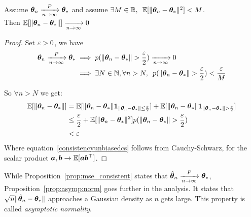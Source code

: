 \begin{proposition}
  \label{prop:consistency_unbiasedness}
  Assume $\boldsymbol{\theta}_n\xrightarrow[n \rightarrow \infty]{P} \boldsymbol{\theta}_*$ and assume
  $\exists M \in \mathbb{R}, \enspace \mathbb{E}[\|\boldsymbol{\theta}_n - \boldsymbol{\theta}_*\|^2] < M$. \\
  Then $\mathbb{E}[\|\boldsymbol{\theta}_n - \boldsymbol{\theta}_*\|] \xrightarrow[n \rightarrow \infty]{} 0$
\end{proposition}
\begin{proof}
  Set $\varepsilon > 0$, we have
  \begin{align}
    \boldsymbol{\theta}_n\xrightarrow[n \rightarrow \infty]{P} \boldsymbol{\theta}_* &\implies p(\|\boldsymbol{\theta}_n - \boldsymbol{\theta}_*\| > \frac{\varepsilon}{2}) \xrightarrow[n \rightarrow
                                                             \infty]{}0\\
                                                           &\implies \exists N \in \mathbb{N}, \forall n > N, \enspace
                                                             p(\|\boldsymbol{\theta}_n - \boldsymbol{\theta}_*\| > \frac{\varepsilon}{2}) < \frac{\varepsilon}{M}
  \end{align}

  So $\forall n > N$ we get:
  \begin{align}
    \mathbb{E}[\|\boldsymbol{\theta}_n - \boldsymbol{\theta}_*\|] &= \mathbb{E}[\|\boldsymbol{\theta}_n - \boldsymbol{\theta}_*\| \boldsymbol{1}_{\|\boldsymbol{\theta}_n - \boldsymbol{\theta}_*\| \leq \frac{\varepsilon}{2}}] + \mathbb{E}[\|\boldsymbol{\theta}_n - \boldsymbol{\theta}_*\| \boldsymbol{1}_{\|\boldsymbol{\theta}_n - \boldsymbol{\theta}_*\|  > \frac{\varepsilon}{2}}] \\
                                 &\leq  \frac{\varepsilon}{2} + \mathbb{E}[\|\boldsymbol{\theta}_n - \boldsymbol{\theta}_*\|^2]p(\|\boldsymbol{\theta}_n - \boldsymbol{\theta}_*\|  > \frac{\varepsilon}{2}) \label{consistencyunbiasedcs} \\
                                   &< \varepsilon
  \end{align}
  Where equation~\eqref{consistencyunbiasedcs} follows from Cauchy-Schwarz, for
  the scalar product $\boldsymbol{a}, \boldsymbol{b} \rightarrow \mathbb{E}[\boldsymbol{a} \boldsymbol{b}^{\top}]$.
\end{proof}

While Proposition~\ref{prop:mse_consistent} states that $\hat{\boldsymbol{\theta}}_n
\xrightarrow[n \rightarrow \infty]{P} \boldsymbol{\theta}_*$, 
Proposition~\ref{prop:asymp:norm} goes further in the analysis. It states that
$\sqrt{n}\|\hat{\boldsymbol{\theta}}_n - \boldsymbol{\theta}_*\|$ approaches a Gaussian density as $n$
gets large.
This property is called \emph{asymptotic normality}.

